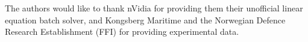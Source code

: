\documentclass[12pt,journal,captionsoff,onecolumn]{IEEEtran}
\newcounter{todoidx}
\newlength\marginparwidthsmall
\newcommand\todo[1]{%
      \addtocounter{todoidx}{1}%
      {\color{Red}\fbox{\bf\thetodoidx{}}}%
      \marginpar{%
         {\vspace*{-10pt}\color{Red}\fbox{\bf\thetodoidx{}}}\\%
         \fcolorbox{red}{todobackground}{\parbox{\marginparwidthsmall}{\scriptsize #1}}}}
\newcommand\todopar[1]{\fcolorbox{red}{white}{\parbox{0.97\linewidth}{#1}}}
\newcommand\todo[1]{}
\renewcommand\H{^{\scriptscriptstyle H}}
\renewcommand\vec[1]{\boldsymbol{#1}}
\newcommand\mat[1]{\boldsymbol{#1}}
\newcommand\1{\vec 1}
\renewcommand*\a{\vec a}
\newcommand*\w{\vec w}
\newcommand*\R{\mat R}
\newcommand*\Ri{\R^{-1}}
\newcommand*\eR{\mat{\hat R}}
\begin{document}
The authors would like to thank nVidia for providing them their unofficial linear equation batch solver, and Kongsberg Maritime and the Norwegian Defence Research Establishment (FFI) for providing experimental data.
% 
% 
% 
% 
% 
% 
% 
% 
\end{document}
